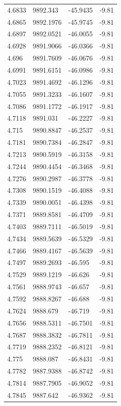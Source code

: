\begin{table}[H]
\begin{tabular}{llll}
4.6833 & 9892.343 & -45.9435 & -9.81 \\
4.6865 & 9892.1976 & -45.9745 & -9.81 \\
4.6897 & 9892.0521 & -46.0055 & -9.81 \\
4.6928 & 9891.9066 & -46.0366 & -9.81 \\
4.696 & 9891.7609 & -46.0676 & -9.81 \\
4.6991 & 9891.6151 & -46.0986 & -9.81 \\
4.7023 & 9891.4692 & -46.1296 & -9.81 \\
4.7055 & 9891.3233 & -46.1607 & -9.81 \\
4.7086 & 9891.1772 & -46.1917 & -9.81 \\
4.7118 & 9891.031 & -46.2227 & -9.81 \\
4.715 & 9890.8847 & -46.2537 & -9.81 \\
4.7181 & 9890.7384 & -46.2847 & -9.81 \\
4.7213 & 9890.5919 & -46.3158 & -9.81 \\
4.7244 & 9890.4454 & -46.3468 & -9.81 \\
4.7276 & 9890.2987 & -46.3778 & -9.81 \\
4.7308 & 9890.1519 & -46.4088 & -9.81 \\
4.7339 & 9890.0051 & -46.4398 & -9.81 \\
4.7371 & 9889.8581 & -46.4709 & -9.81 \\
4.7403 & 9889.7111 & -46.5019 & -9.81 \\
4.7434 & 9889.5639 & -46.5329 & -9.81 \\
4.7466 & 9889.4167 & -46.5639 & -9.81 \\
4.7497 & 9889.2693 & -46.595 & -9.81 \\
4.7529 & 9889.1219 & -46.626 & -9.81 \\
4.7561 & 9888.9743 & -46.657 & -9.81 \\
4.7592 & 9888.8267 & -46.688 & -9.81 \\
4.7624 & 9888.679 & -46.719 & -9.81 \\
4.7656 & 9888.5311 & -46.7501 & -9.81 \\
4.7687 & 9888.3832 & -46.7811 & -9.81 \\
4.7719 & 9888.2352 & -46.8121 & -9.81 \\
4.775 & 9888.087 & -46.8431 & -9.81 \\
4.7782 & 9887.9388 & -46.8742 & -9.81 \\
4.7814 & 9887.7905 & -46.9052 & -9.81 \\
4.7845 & 9887.642 & -46.9362 & -9.81 \\

\end{tabular}
\end{table}
